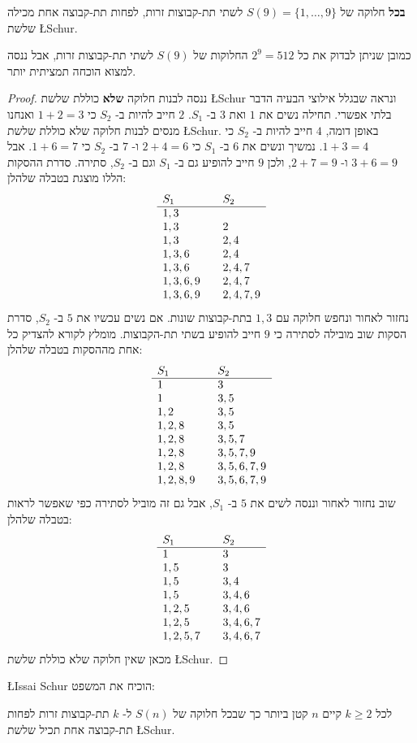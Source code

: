 \begin{theorem}
\textbf{בכל}
חלוקה של
$S(9)=\{1,\ldots,9\}$
לשתי תת-קבוצות זרות, לפחות תת-קבוצה אחת מכילה שלשת
\L{Schur}.
\end{theorem}
כמובן שניתן לבדוק את כל
$2^9=512$
החלוקות של 
$S(9)$
לשתי תת-קבוצות זרות, אבל ננסה למצוא הוכחה תמציתית יותר.

\begin{proof}
ננסה לבנות חלוקה 
\textbf{שלא}
כוללת שלשת
\L{Schur}
ונראה שבגלל אילוצי הבעיה הדבר בלתי אפשרי. תחילה נשים את
$1$
ואת
$3$
ב-%
$S_1$.
$2$
חייב להיות ב-%
$S_2$
כי
$1+2=3$
ואנחנו מנסים לבנות חלוקה שלא כוללת שלשת
\L{Schur}.
באופן דומה, 
$4$
חייב להיות ב-%
$S_2$
כי
$1+3=4$.
נמשיך ונשים את
$6$
ב-%
$S_1$
כי
$2+4=6$
ו-%
$7$
ב-%
$S_2$
כי
$1+6=7$.
אבל
$3+6=9$
ו-%
$2+7=9$,
ולכן
$9$
חייב להופיע גם ב-%
$S_1$
וגם ב-%
$S_2$, 
סתירה. סדרת ההסקות הללו מוצגת בטבלה שלהלן:
\[
\begin{array}{l@{\hspace{2em}}l}
S_1&S_2\\\hline
1,3 & \\
1,3 & 2\\
1,3 & 2,4\\
1,3,6 & 2,4\\
1,3,6 & 2,4,7\\
1,3,6,9 & 2,4,7\\
1,3,6,9 & 2,4,7,9
\end{array}
\]
נחזור לאחור ונחפש חלוקה עם 
$1,3$
בתת-קבוצות שונות. אם נשים עכשיו את 
$5$
ב-%
$S_2$, 
סדרת הסקות שוב מובילה לסתירה כי 
$9$
חייב להופיע בשתי תת-הקבוצות. מומלץ לקורא להצדיק כל אחת מההסקות בטבלה שלהלן:
\[
\begin{array}{l@{\hspace{2em}}l}
S_1&S_2\\\hline
1&3\\
1 & 3,5\\
1,2&3,5\\
1,2,8&3,5\\
1,2,8&3,5,7\\
1,2,8&3,5,7,9\\
1,2,8&3,5,6,7,9\\
1,2,8,9&3,5,6,7,9
\end{array}
\]
שוב נחזור לאחור וננסה לשים את 
$5$
ב-%
$S_1$,
אבל גם זה מוביל לסתירה כפי שאפשר לראות בטבלה שלהלן:
\[
\begin{array}{l@{\hspace{2em}}l}
S_1&S_2\\\hline
1&3\\
1,5& 3\\
1,5&3,4\\
1,5&3,4,6\\
1,2,5&3,4,6\\
1,2,5&3,4,6,7\\
1,2,5,7&3,4,6,7
\end{array}
\]
מכאן שאין חלוקה שלא כוללת שלשת
\L{Schur}.
\end{proof}
\L{Issai Schur}
הוכיח את המשפט:
\begin{theorem}[\L{Schur}]
לכל 
$k\geq 2$
קיים 
$n$
קטן ביותר כך שבכל חלוקה של
$S(n)$
ל-%
$k$
תת-קבוצות זרות לפחות תת-קבוצה אחת תכיל שלשת
\L{Schur}.
\end{theorem}

